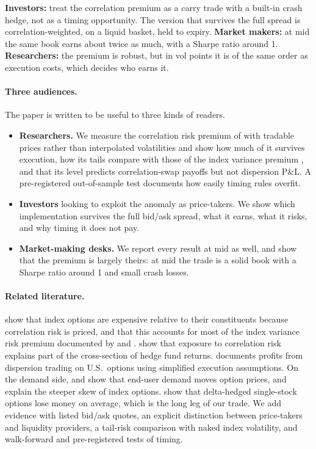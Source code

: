 \begin{desk}
\textbf{Investors:} treat the correlation premium as a carry trade with a built-in crash hedge, not as a timing opportunity. The version that survives the full spread is correlation-weighted, on a liquid basket, held to expiry. \textbf{Market makers:} at mid the same book earns about twice as much, with a Sharpe ratio around 1. \textbf{Researchers:} the premium is robust, but in vol points it is of the same order as execution costs, which decides who earns it.
\end{desk}

\paragraph{Three audiences.} The paper is written to be useful to three kinds of readers.
\begin{itemize}
  \item \textbf{Researchers.} We measure the correlation risk premium of \citet{DMV2009} with tradable prices rather than interpolated volatilities and show how much of it survives execution, how its tails compare with those of the index variance premium \citep{CarrWu2009}, and that its level predicts correlation-swap payoffs but not dispersion P\&L. A pre-registered out-of-sample test documents how easily timing rules overfit.
  \item \textbf{Investors} looking to exploit the anomaly as price-takers. We show which implementation survives the full bid/ask spread, what it earns, what it risks, and why timing it does not pay.
  \item \textbf{Market-making desks.} We report every result at mid as well, and show that the premium is largely theirs: at mid the trade is a solid book with a Sharpe ratio around 1 and small crash losses.
\end{itemize}

\paragraph{Related literature.} \citet{DMV2009} show that index options are expensive relative to their constituents because correlation risk is priced, and that this accounts for most of the index variance risk premium documented by \citet{BakshiKapadia2003} and \citet{CarrWu2009}. \citet{BKT2014} show that exposure to correlation risk explains part of the cross-section of hedge fund returns. \citet{Marshall2009} documents profits from dispersion trading on U.S.\ options using simplified execution assumptions. On the demand side, \citet{BollenWhaley2004} and \citet{GPP2009} show that end-user demand moves option prices, and \citet{BKM2003} explain the steeper skew of index options. \citet{CaoHan2013} show that delta-hedged single-stock options lose money on average, which is the long leg of our trade. We add evidence with listed bid/ask quotes, an explicit distinction between price-takers and liquidity providers, a tail-risk comparison with naked index volatility, and walk-forward and pre-registered tests of timing.


